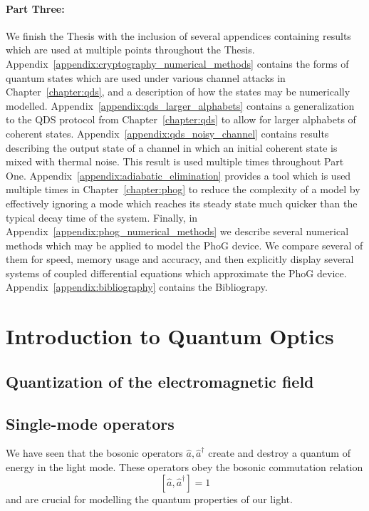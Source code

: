 \paragraph{Part Three:} We finish the Thesis with the inclusion of several appendices containing results which are used at multiple points throughout the Thesis. Appendix~\ref{appendix:cryptography_numerical_methods} contains the forms of quantum states which are used under various channel attacks in Chapter~\ref{chapter:qds}, and a description of how the states may be numerically modelled. Appendix~\ref{appendix:qds_larger_alphabets} contains a generalization to the QDS protocol from Chapter~\ref{chapter:qds} to allow for larger alphabets of coherent states. Appendix~\ref{appendix:qds_noisy_channel} contains results describing the output state of a channel in which an initial coherent state is mixed with thermal noise. This result is used multiple times throughout Part One. Appendix~\ref{appendix:adiabatic_elimination} provides a tool which is used multiple times in Chapter~\ref{chapter:phog} to reduce the complexity of a model by effectively ignoring a mode which reaches its steady state much quicker than the typical decay time of the system. Finally, in Appendix~\ref{appendix:phog_numerical_methods} we describe several numerical methods which may be applied to model the PhoG device. We compare several of them for speed, memory usage and accuracy, and then explicitly display several systems of coupled differential equations which approximate the PhoG device. Appendix~\ref{appendix:bibliography} contains the Bibliograpy.

\section{Introduction to Quantum Optics}

\subsection{Quantization of the electromagnetic field}

\subsection{Single-mode operators}
We have seen that the bosonic operators $\hat{a}, \hat{a}^\dagger$ create and destroy a quantum of energy in the light mode. These operators obey the bosonic commutation relation
\begin{equation}
\left[ \hat{a}, \hat{a}^\dagger \right] = 1
\end{equation}
and are crucial for modelling the quantum properties of our light. 

